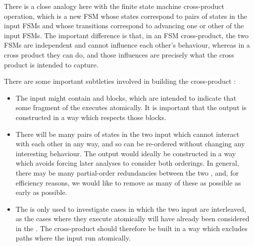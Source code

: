 There is a close analogy here with the finite state machine
cross-product operation, which is a new FSM whose states correspond to
pairs of states in the input FSMs and whose transitions correspond to
advancing one or other of the input FSMs.  The important difference is
that, in an FSM cross-product, the two FSMs are independent and cannot
influence each other's behaviour, whereas in a {\StateMachine} cross
product they can do, and those influences are precisely what the cross
product is intended to capture.

There are some important subtleties involved in building the
cross-product {\StateMachine}:

\begin{itemize}
\item The input {\StateMachines} might contain {\stStartAtomic} and
  {\stEndAtomic} blocks, which are intended to indicate that some
  fragment of the {\StateMachine} executes atomically.  It is
  important that the output {\StateMachine} is constructed in a way
  which respects those blocks.
\item There will be many pairs of states in the two input
  {\StateMachines} which cannot interact with each other in any way,
  and so can be re-ordered without changing any interesting behaviour.
  The output {\StateMachine} would ideally be constructed in a way
  which avoids forcing later analyses to consider both orderings.  In
  general, there may be many partial-order redundancies\needCite{}
  between the two {\StateMachines}, and, for efficiency reasons, we
  would like to remove as many of these as possible as early as
  possible.
\item The  is only used to investigate
  cases in which the two input {\StateMachines} are interleaved, as
  the cases where they execute atomically will have already been
  considered in the .  The cross-product
  {\StateMachine} should therefore be built in a way which excludes
  paths where the input {\StateMachines} run atomically.
\end{itemize}

